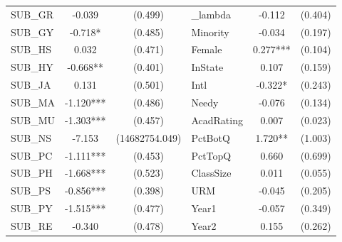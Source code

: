 \begin{table}[htb]
\begin{threeparttable}
\begin{tabular}{l c c|l c c}
    \cline{4-6}
    SUB\_GR                                      & -0.039                    & (0.499)              & \_lambda            & -0.112                 & (0.404)              \\
    SUB\_GY                                      & -0.718*                   & (0.485)              & Minority            & -0.034                 & (0.197)              \\
    SUB\_HS                                      & 0.032                     & (0.471)              & Female              & 0.277***               & (0.104)              \\
    SUB\_HY                                      & -0.668**                  & (0.401)              & InState             & 0.107                  & (0.159)              \\
    SUB\_JA                                      & 0.131                     & (0.501)              & Intl                & -0.322*                & (0.243)              \\
    SUB\_MA                                      & -1.120***                 & (0.486)              & Needy               & -0.076                 & (0.134)              \\
    SUB\_MU                                      & -1.303***                 & (0.457)              & AcadRating          & 0.007                  & (0.023)              \\
    SUB\_NS                                      & -7.153                    & (14682754.049)       & PctBotQ             & 1.720**                & (1.003)              \\
    SUB\_PC                                      & -1.111***                 & (0.453)              & PctTopQ             & 0.660                  & (0.699)              \\
    SUB\_PH                                      & -1.668***                 & (0.523)              & ClassSize           & 0.011                  & (0.055)              \\
    SUB\_PS                                      & -0.856***                 & (0.398)              & URM                 & -0.045                 & (0.205)              \\
    SUB\_PY                                      & -1.515***                 & (0.477)              & Year1               & -0.057                 & (0.349)              \\
    SUB\_RE                                      & -0.340                    & (0.478)              & Year2               & 0.155                  & (0.262)              \\

\end{tabular}
\end{threeparttable}
\end{table}
